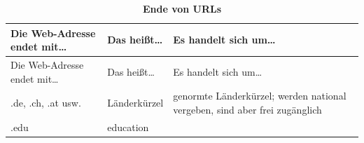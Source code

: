 \documentclass[]{book}
\theoremstyle{definition}
\theoremstyle{definition}
\theoremstyle{definition}
\theoremstyle{remark}
\begin{document}
\begin{longtable}[]{@{}lll@{}}
\caption{\textbf{\label{tab:urls2} Ende von URLs}}\tabularnewline
\toprule
\begin{minipage}[b]{0.23\columnwidth}\raggedright\strut
Die Web-Adresse endet mit\ldots{}\strut
\end{minipage} & \begin{minipage}[b]{0.13\columnwidth}\raggedright\strut
Das heißt\ldots{}\strut
\end{minipage} & \begin{minipage}[b]{0.56\columnwidth}\raggedright\strut
Es handelt sich um\ldots{}\strut
\end{minipage}\tabularnewline
\midrule
\endfirsthead
\toprule
\begin{minipage}[b]{0.23\columnwidth}\raggedright\strut
Die Web-Adresse endet mit\ldots{}\strut
\end{minipage} & \begin{minipage}[b]{0.13\columnwidth}\raggedright\strut
Das heißt\ldots{}\strut
\end{minipage} & \begin{minipage}[b]{0.56\columnwidth}\raggedright\strut
Es handelt sich um\ldots{}\strut
\end{minipage}\tabularnewline
\midrule
\endhead
\begin{minipage}[t]{0.23\columnwidth}\raggedright\strut
.de, .ch, .at usw. \vspace{5mm}\strut
\end{minipage} & \begin{minipage}[t]{0.13\columnwidth}\raggedright\strut
Länderkürzel \vspace{5mm}\strut
\end{minipage} & \begin{minipage}[t]{0.56\columnwidth}\raggedright\strut
genormte Länderkürzel; werden national vergeben, sind aber frei
zugänglich \vspace{5mm}\strut
\end{minipage}\tabularnewline
\begin{minipage}[t]{0.23\columnwidth}\raggedright\strut
.edu \vspace{5mm}\strut
\end{minipage} & \begin{minipage}[t]{0.13\columnwidth}\raggedright\strut
education \vspace{5mm}\strut
\end{minipage} & \begin{minipage}[t]{0.56\columnwidth}\raggedright\strut

\end{minipage}
\end{longtable}
\end{document}
